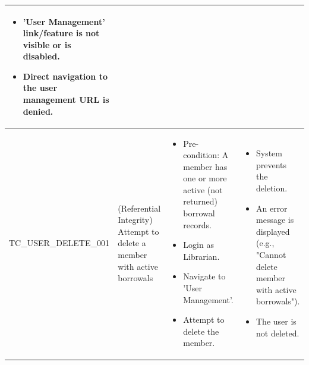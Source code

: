 \begin{longtable}{|>{\scriptsize\raggedright\arraybackslash}p{4.2cm}|>{\raggedright\arraybackslash}p{3.5cm}|>{\raggedright\arraybackslash}p{3.5cm}|>{\raggedright\arraybackslash}p{3.8cm}|}
\begin{itemize}[noitemsep, topsep=0pt, partopsep=0pt, leftmargin=*]
        \item 'User Management' link/feature is not visible or is disabled.
        \item Direct navigation to the user management URL is denied.
    \end{itemize} \\ \hline
TC\_USER\_DELETE\_001 & (Referential Integrity) Attempt to delete a member with active borrowals & 
    \begin{itemize}[noitemsep, topsep=0pt, partopsep=0pt, leftmargin=*]
        \item Pre-condition: A member has one or more active (not returned) borrowal records.
        \item Login as Librarian.
        \item Navigate to 'User Management'.
        \item Attempt to delete the member.
    \end{itemize} & 
    \begin{itemize}[noitemsep, topsep=0pt, partopsep=0pt, leftmargin=*]
        \item System prevents the deletion.
        \item An error message is displayed (e.g., "Cannot delete member with active borrowals").
        \item The user is not deleted.
    \end{itemize} \\ \hline


\end{longtable}
